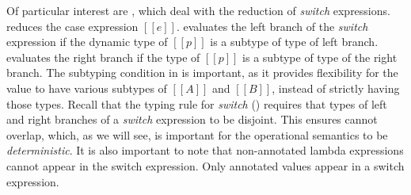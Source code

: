 Of particular interest are
, which deal with the reduction
of \emph{switch} expressions.
 reduces the case expression $[[e]]$.
 evaluates
the left branch of the \emph{switch} expression if the dynamic type of $[[p]]$ is
a subtype of type of left branch.  evaluates the right
branch if the type of $[[p]]$ is a subtype
of type of the right branch. The subtyping condition in
 is important, as it provides
flexibility for the value to have various subtypes of $[[A]]$ and $[[B]]$, instead
of strictly having those types. Recall that
the typing rule for \emph{switch} () requires that
types of left and right branches of a \emph{switch}
expression to be disjoint.
This ensures  cannot overlap, which, as we will
see, is important for the
operational semantics to be \textit{deterministic}.
It is also important to note that non-annotated lambda expressions cannot appear
in the switch expression. Only annotated values appear in a switch expression.



\begin{comment}
\paragraph{Dynamic Type} The dynamic semantics employs a simple
function that retrieves the dynamic type of a pre-value.
The definition is shown in the lower part of \Cref{fig:union:os}.
$[[Int]]$ is returned when $[[p]]$ is an integer $[[i]]$.
Otherwise, for functions, the function annotation $[[A -> B]]$ is returned.
\end{comment}



